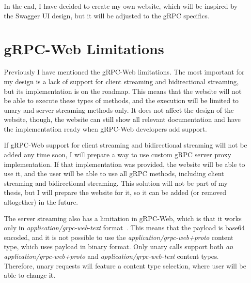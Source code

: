 In the end, I have decided to create my own website, which will be inspired by the Swagger UI design, but it will be adjusted to the gRPC specifics.


\section{gRPC-Web Limitations}
Previously I have mentioned the gRPC-Web limitations.
The most important for my design is a lack of support for client streaming and bidirectional streaming, but its implementation is on the roadmap.
This means that the website will not be able to execute these types of methods, and the execution will be limited to unary and server streaming methods only.
It does not affect the design of the website, though, the website can still show all relevant documentation and have the implementation ready when gRPC-Web developers add support.

If gRPC-Web support for client streaming and bidirectional streaming will not be added any time soon, I will prepare a way to use custom gRPC server proxy implementation.
If that implementation was provided, the website will be able to use it, and the user will be able to use all gRPC methods, including client streaming and bidirectional streaming.
This solution will not be part of my thesis, but I will prepare the website for it, so it can be added (or removed altogether) in the future.


The server streaming also has a limitation in gRPC-Web, which is that it works only in \textit{application/grpc-web-text} format~\cite{grpc-web}.
This means that the payload is base64 encoded, and it is not possible to use the \textit{application/grpc-web+proto} content type, which uses payload in binary format.
Only unary calls support both \textit{an application/grpc-web+proto} and \textit{application/grpc-web-text} content types.
Therefore, unary requests will feature a content type selection, where user will be able to change it.


